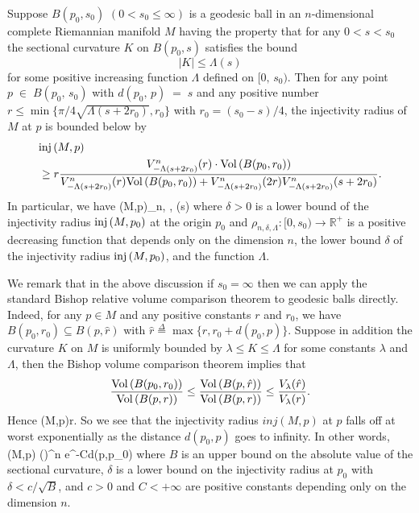 \begin{corollary}
  \label{cor:cz-injectivity-radius-from-local-curvature-scale}
Suppose $B(p_0, s_0)$ $(0<s_0\le \infty)$ is a geodesic ball in an
$n$-dimensional complete Riemannian manifold $M$ having the
property that for any $0<s<s_0$ the sectional curvature $K$ on
$B(p_0, s)$ satisfies the bound
$$
|K|\le \Lambda(s)
$$
for\; some\; positive\; increasing\; function\; $\Lambda$\;
defined\; on\; $[0,\,s_0)$.\; Then\; for\; any\; point\; $p\;\in\;
B(p_0,\, s_0)$\; with\; $d(p_0,\, p)\;=\;s$\; and\; any\;
positive\; number $r\le \min\{\pi/4\sqrt{\Lambda(s+2r_0)},r_0\}$
with $r_0=(s_0-s)/4$, the injectivity radius of $M$ at $p$ is
bounded below by
\begin{align*}
& {\rm inj}\,(M,p) \\
&\geq r \frac{V^{n}_{-\Lambda(s+2r_0)}(r)\cdot
{\rm Vol}\,(B(p_0,r_0))}{V^{n}_{-\Lambda(s+2r_0)}(r){\rm Vol}\,(B(p_0,r_0))+
V_{-\Lambda(s+2r_0)}^n(2r)V^{n}_{-\Lambda(s+2r_0)}(s+2r_0)}.
\end{align*}
In particular, we have \be
\inj(M,p)\geq \rho_{n, \delta, \Lambda}(s) %
\ee where $\delta>0$ is a lower bound of the injectivity radius
${\rm inj}\,(M, p_0)$ at the origin $p_0$ and $\rho_{n,\delta, \Lambda}:
[0, s_0) \to \mathbb{R^+}$ is a positive decreasing function that
depends only on the dimension $n$, the lower bound $\delta$ of the
injectivity radius ${\rm inj}\,(M,p_0)$, and the function $\Lambda$.
\end{corollary}

We remark that in the above discussion if $s_0=\infty$ then we can
apply the standard Bishop relative volume comparison theorem to
geodesic balls directly. Indeed, for any $p\in M$ and any positive
constants $r$ and $r_0$, we have $B(p_0, r_0)\subseteq B(p,
\hat{r})$ with
$\hat{r}\stackrel{\Delta}{=}\max\{r,r_0+d(p_0,p)\}$. Suppose in
addition the curvature $K$ on $M$ is uniformly bounded by
$\lambda\le K\le\Lambda$ for some constants $\lambda$ and
$\Lambda$, then the Bishop volume comparison theorem implies that
$$
\frac{{\rm Vol}\,(B(p_0,r_0))}{{\rm Vol}\,(B(p,r))}\le
\frac{{\rm Vol}\,(B(p,\hat{r}))}{{\rm Vol}\,(B(p,r))}\le
\frac{V_{\lambda}(\hat{r})}{V_{\lambda}(r)}.$$ Hence \be
\inj(M,p)\geq r. %
\ee So we see that the injectivity radius $inj(M,p)$ at $p$ falls
off at worst exponentially as the distance $d(p_0,p)$ goes to
infinity. In other words, \be \inj(M,p)\geq
{}(\delta {})^n
e^{-Cd(p,p_0)} %
\ee where $B$ is an upper bound on the absolute value of the
sectional curvature, $\delta$ is a lower bound on the injectivity
radius at $p_0$ with $\delta<c/\sqrt{B}$, and $c>0$ and $C<+\infty
$ are positive constants depending only on the dimension $n$.

